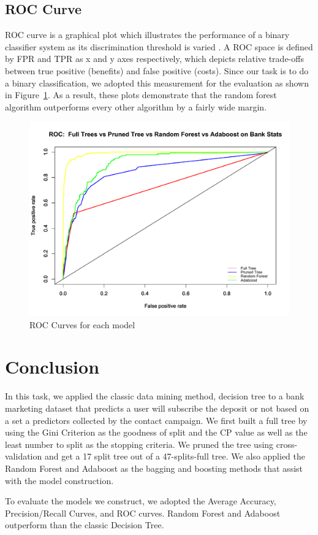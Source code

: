 \documentclass[letter]{article}
\begin{document}
\subsection{ROC Curve}
ROC curve is a graphical plot which illustrates the performance of a binary
classifier system as its discrimination threshold is varied \cite{green1966signal}.
 A ROC space is defined by FPR and TPR as x and y axes respectively, which
depicts relative trade-offs between true positive (benefits) and false 
positive (costs). Since our task is to do a binary classification, we 
adopted this measurement for the evaluation as shown in Figure~\ref{roc}.
As a result, these plots demonstrate that the random forest algorithm
outperforms every other algorithm by a fairly wide margin.


\begin{figure}[!tp]
\centering
\includegraphics[width=1.2\columnwidth]{fig/roc}
\caption{ROC Curves for each model}
\label{roc}
\end{figure}

\section{Conclusion}
In this task, we applied the classic data mining method, decision tree to a
bank marketing dataset that predicts a user will subscribe the deposit or not
based on a set a predictors collected by the contact campaign. We first 
built a full tree by using the Gini Criterion as the goodness of split and 
the CP value as well as the least number to split as the stopping criteria.
We pruned the tree using cross-validation and get a 17 split tree out of a 
47-splits-full tree. We also applied the Random Forest and Adaboost as the 
bagging and boosting methods that assist with the model construction. 

To evaluate the models we construct, we adopted the Average Accuracy, 
Precision/Recall Curves, and ROC curves. Random Forest and Adaboost 
outperform than the classic Decision Tree.






\end{document}
